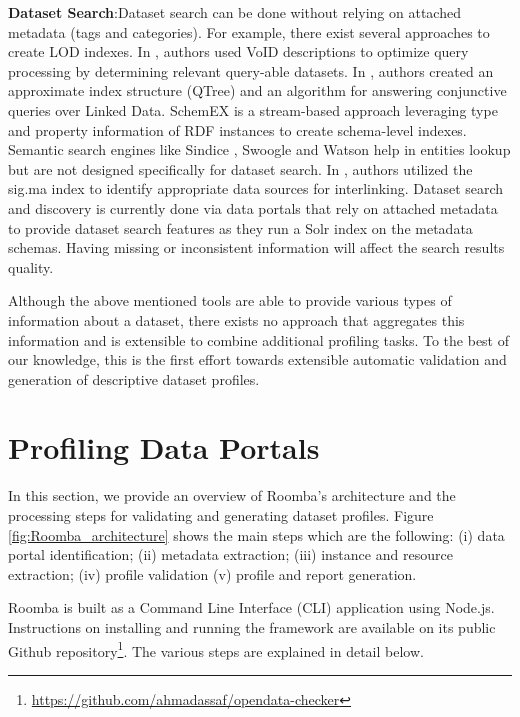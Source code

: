 \documentclass[runningheads,a4paper]{llncs}
\begin{document}
\textbf{Dataset Search}:Dataset search can be done without relying on attached metadata (tags and categories). For example, there exist several approaches to create LOD indexes. In \cite{Alexander:LDOW09}, authors used VoID descriptions to optimize query processing by determining relevant query-able datasets. In \cite{Harth:2010:DSO:1772690.1772733}, authors created an approximate index structure (QTree) and an algorithm for answering conjunctive queries over Linked Data. SchemEX \cite{Konrath:2012:SEC:2399444.2399563} is a stream-based approach leveraging type and property information of RDF instances to create schema-level indexes.\\
Semantic search engines like Sindice \cite{Delbru2010a}, Swoogle \cite{Ding2004} and Watson \cite{d'Aquin:2011:WMS:2019470.2019476} help in entities lookup but are not designed specifically for dataset search. In \cite{whatShouldILinkTo}, authors utilized the sig.ma index \cite{sig.ma} to identify appropriate data sources for interlinking. Dataset search and discovery is currently done via data portals that rely on attached metadata to provide dataset search features as they run a Solr index on the metadata schemas. Having missing or inconsistent information will affect the search results quality.

Although the above mentioned tools are able to provide various types of information about a dataset, there exists no approach that aggregates this information and is extensible to combine additional profiling tasks. To the best of our knowledge, this is the first effort towards extensible automatic validation and generation of descriptive dataset profiles.


\section{Profiling Data Portals}
\label{sec:framework}

In this section, we provide an overview of Roomba's architecture and the processing steps for validating and generating dataset profiles. Figure \ref{fig:Roomba_architecture} shows the main steps which are the following: (i) data portal identification; (ii) metadata extraction; (iii) instance and resource extraction; (iv) profile validation (v) profile and report generation.

Roomba is built as a Command Line Interface (CLI) application using Node.js. Instructions on installing and running the framework are available on its public Github repository\footnote{\url{https://github.com/ahmadassaf/opendata-checker}}. The various steps are explained in detail below.
\end{document}
